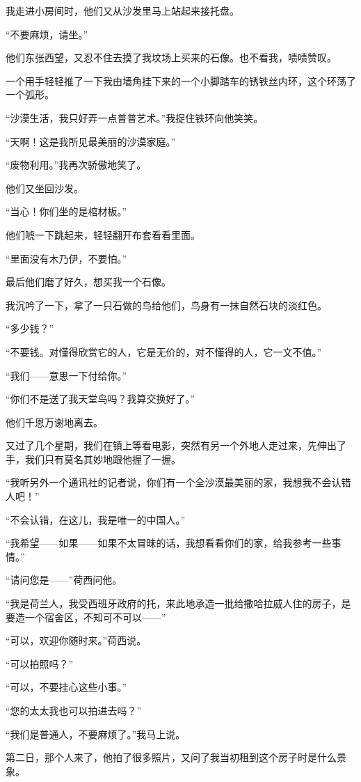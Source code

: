\par 我走进小房间时，他们又从沙发里马上站起来接托盘。
\par “不要麻烦，请坐。”
\par 他们东张西望，又忍不住去摸了我坟场上买来的石像。也不看我，啧啧赞叹。
\par 一个用手轻轻推了一下我由墙角挂下来的一个小脚踏车的锈铁丝内环，这个环荡了一个弧形。
\par “沙漠生活，我只好弄一点普普艺术。”我捉住铁环向他笑笑。
\par “天啊！这是我所见最美丽的沙漠家庭。”
\par “废物利用。”我再次骄傲地笑了。
\par 他们又坐回沙发。
\par “当心！你们坐的是棺材板。”
\par 他们唬一下跳起来，轻轻翻开布套看看里面。
\par “里面没有木乃伊，不要怕。”
\par 最后他们磨了好久，想买我一个石像。
\par 我沉吟了一下，拿了一只石做的鸟给他们，鸟身有一抹自然石块的淡红色。
\par “多少钱？”
\par “不要钱。对懂得欣赏它的人，它是无价的，对不懂得的人，它一文不值。”
\par “我们——意思一下付给你。”
\par “你们不是送了我天堂鸟吗？我算交换好了。”
\par 他们千恩万谢地离去。
\par 又过了几个星期，我们在镇上等看电影，突然有另一个外地人走过来，先伸出了手，我们只有莫名其妙地跟他握了一握。
\par “我听另外一个通讯社的记者说，你们有一个全沙漠最美丽的家，我想我不会认错人吧！”
\par “不会认错，在这儿，我是唯一的中国人。”
\par “我希望——如果——如果不太冒昧的话，我想看看你们的家，给我参考一些事情。”
\par “请问您是——”荷西问他。
\par “我是荷兰人，我受西班牙政府的托，来此地承造一批给撒哈拉威人住的房子，是要造一个宿舍区，不知可不可以——”
\par “可以，欢迎你随时来。”荷西说。
\par “可以拍照吗？”
\par “可以，不要挂心这些小事。”
\par “您的太太我也可以拍进去吗？”
\par “我们是普通人，不要麻烦了。”我马上说。
\par 第二日，那个人来了，他拍了很多照片，又问了我当初租到这个房子时是什么景象。
